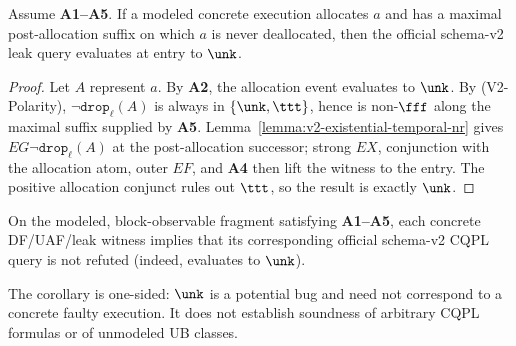 \begin{theorem}
\label{theorem:v2-leak-query-nr}
Assume \textbf{A1--A5}. If a modeled concrete execution allocates $a$ and has a
maximal post-allocation suffix on which $a$ is never deallocated, then the
official schema-v2 leak query evaluates at entry to $\unk$.
\end{theorem}
\begin{proof}
Let $A$ represent $a$.  By \textbf{A2}, the allocation event evaluates to
$\unk$. By (V2-Polarity), $\neg\texttt{drop}_\ell(A)$ is always in
$\{\unk,\ttt\}$, hence is non-$\fff$ along the maximal suffix supplied by
\textbf{A5}.  Lemma~\ref{lemma:v2-existential-temporal-nr} gives
$EG\neg\texttt{drop}_\ell(A)$ at the post-allocation successor; strong $EX$,
conjunction with the allocation atom, outer $EF$, and \textbf{A4} then lift the
witness to the entry.  The positive allocation conjunct rules out $\ttt$, so
the result is exactly $\unk$.
\end{proof}

\begin{corollary}
\label{corollary:v2-official-query-no-fn}
On the modeled, block-observable fragment satisfying \textbf{A1--A5}, each
concrete DF/UAF/leak witness implies that its corresponding official schema-v2
CQPL query is not refuted (indeed, evaluates to $\unk$).
\end{corollary}

\noindent
The corollary is one-sided: $\unk$ is a potential bug and need not correspond
to a concrete faulty execution.  It does not establish soundness of arbitrary
CQPL formulas or of unmodeled UB classes.
